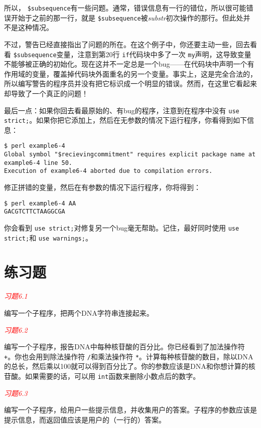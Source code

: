 所以， \verb|$subsequence|有一些问题。通常，错误信息有一行的错位，所以很可能错误开始于之前的那一行，就是 \verb|$subsequence|被\textit{substr}初次操作的那行。但此处并不是这种情况。

不过，警告已经直接指出了问题的所在。在这个例子中，你还要主动一些，回去看看 \verb|$subsequence|变量，注意到第20行 \verb|if|代码块中多了一次 \verb|my|声明，这导致变量不能够被正确的初始化。现在这并不一定总是一个bug——在代码块中声明一个有作用域的变量，覆盖掉代码块外面重名的另一个变量。事实上，这是完全合法的，所以编写警告的程序员并没有把它标识成一个明显的错误。然而，在这里它看起来却导致了一个真正的问题！

最后一点：如果你回去看最原始的、有bug的程序，注意到在程序中没有 \verb|use strict;|。如果你把它添加上，然后在无参数的情况下运行程序，你看得到如下信息：

\begin{lstlisting}
$ perl example6-4   
Global symbol "$recievingcommitment" requires explicit package name at example6-4 line 50.
Execution of example6-4 aborted due to compilation errors.
\end{lstlisting}

修正拼错的变量，然后在有参数的情况下运行程序，你将得到：

\begin{lstlisting}
$ perl example6-4 AA
GACGTCTTCTAAGGCGA
\end{lstlisting}

你会看到 \verb|use strict;|对修复另一个bug毫无帮助。记住，最好同时使用 \verb|use strict;|和 \verb|use warnings;|。

\section{练习题}
\textcolor{red}{\textit{习题6.1}}
\begin{adjustwidth}{4em}{}
编写一个子程序，把两个DNA字符串连接起来。
\end{adjustwidth}

\textcolor{red}{\textit{习题6.2}}
\begin{adjustwidth}{4em}{}
编写一个子程序，报告DNA中每种核苷酸的百分比。你已经看到了加法操作符 \verb|+|。你也会用到除法操作符 \verb|/|和乘法操作符 \verb|*|。计算每种核苷酸的数目，除以DNA的总长，然后乘以100就可以得到百分比了。你的参数应该是DNA和你想计算的核苷酸。如果需要的话，可以用 \verb|int|函数来删除小数点后的数字。
\end{adjustwidth}

\textcolor{red}{\textit{习题6.3}}
\begin{adjustwidth}{4em}{}
编写一个子程序，给用户一些提示信息，并收集用户的答案。子程序的参数应该是提示信息，而返回值应该是用户的（一行的）答案。
\end{adjustwidth}

